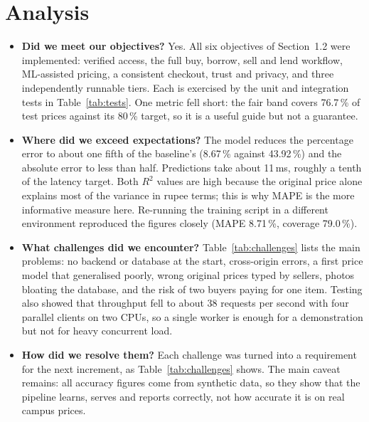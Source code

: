 \documentclass[12pt,letterpaper,twoside,openany]{report}
\begin{document}
\section{Analysis}
\begin{itemize}
  \item \textbf{Did we meet our objectives?} Yes. All six objectives of Section~1.2 were implemented:
        verified access, the full buy, borrow, sell and lend workflow, ML-assisted pricing, a consistent
        checkout, trust and privacy, and three independently runnable tiers. Each is exercised by the unit
        and integration tests in Table~\ref{tab:tests}. One metric fell short: the fair band covers
        76.7\,\% of test prices against its 80\,\% target, so it is a useful guide but not a guarantee.
  \item \textbf{Where did we exceed expectations?} The model reduces the percentage error to about one
        fifth of the baseline's (8.67\,\% against 43.92\,\%) and the absolute error to less than half.
        Predictions take about 11\,ms, roughly a tenth of the latency target. Both $R^2$ values are high
        because the original price alone explains most of the variance in rupee terms; this is why MAPE is
        the more informative measure here. Re-running the training script in a different environment
        reproduced the figures closely (MAPE 8.71\,\%, coverage 79.0\,\%).
  \item \textbf{What challenges did we encounter?} Table~\ref{tab:challenges} lists the main problems: no
        backend or database at the start, cross-origin errors, a first price model that generalised poorly,
        wrong original prices typed by sellers, photos bloating the database, and the risk of two buyers
        paying for one item. Testing also showed that throughput fell to about 38 requests per second with
        four parallel clients on two CPUs, so a single worker is enough for a demonstration but not for heavy
        concurrent load.
  \item \textbf{How did we resolve them?} Each challenge was turned into a requirement for the next
        increment, as Table~\ref{tab:challenges} shows. The main caveat remains: all accuracy figures come
        from synthetic data, so they show that the pipeline learns, serves and reports correctly, not how
        accurate it is on real campus prices.
\end{itemize}
\end{document}
